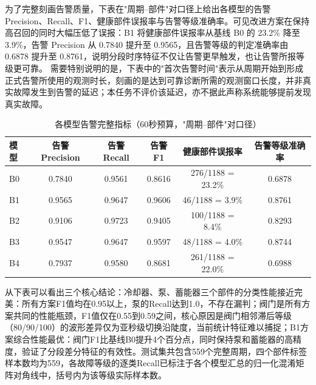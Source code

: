 \documentclass[12pt, a4paper]{ctexart}
\begin{document}
为了完整刻画告警质量，下表在"周期--部件"对口径上给出各模型的告警 Precision、Recall、F1、健康部件误报率与告警等级准确率。可见改进方案在保持高召回的同时大幅压低了误报：B1 将健康部件误报率从基线 B0 的 23.2\% 降至 3.9\%，告警 Precision 从 0.7840 提升至 0.9565，且告警等级的判定准确率由 0.6878 提升至 0.8761，说明分段时序特征不仅让告警更早触发，也让告警所报等级更可靠。
需要特别说明的是，下表中的"首次告警时间"表示从周期开始到形成正式告警所使用的观测时长，刻画的是达到可靠诊断所需的观测窗口长度，并非真实故障发生到告警的延迟；本任务不评价该延迟，亦不据此声称系统能够提前发现真实故障。
\begin{table}[H]
    \centering
    \caption{各模型告警完整指标（60秒预算，"周期--部件"对口径）}
    \label{tab:alarm_full}
    \small
    \setlength{\tabcolsep}{4pt}
    \begin{tabular}{lccccc}
        \toprule
        \textbf{模型} & \textbf{告警Precision} & \textbf{告警Recall} & \textbf{告警F1} & \textbf{健康部件误报率} & \textbf{告警等级准确率} \\
        \midrule
        B0 & 0.7840 & 0.9561 & 0.8616 & 276/1188 = 23.2\% & 0.6878 \\
        B1 & 0.9565 & 0.9647 & 0.9606 & 46/1188 = 3.9\%   & 0.8761 \\
        B2 & 0.9106 & 0.9723 & 0.9405 & 100/1188 = 8.4\%  & 0.8293 \\
        B3 & 0.9547 & 0.9647 & 0.9597 & 48/1188 = 4.0\%   & 0.8744 \\
        B4 & 0.7937 & 0.9580 & 0.8681 & 261/1188 = 22.0\% & 0.6988 \\
        \bottomrule
    \end{tabular}
\end{table}
从下表可以看出三个核心结论：冷却器、泵、蓄能器三个部件的分类性能接近完美：所有方案F1值均在0.95以上，泵的Recall达到1.0，不存在漏判；阀门是所有方案共同的性能瓶颈，F1值仅在0.55到0.59之间，核心原因是阀门相邻滞后等级（80/90/100）的波形差异仅为亚秒级切换沿陡度，当前统计特征难以捕捉；B1方案综合性能最优：阀门F1比基线B0提升4个百分点，同时保持泵和蓄能器的高精度，验证了分段差分特征的有效性。测试集共包含559个完整周期，四个部件标签样本数均为559，各故障等级的逐类Recall已标注于各个模型汇总的归一化混淆矩阵对角线中，括号内为该等级实际样本数。
\end{document}

